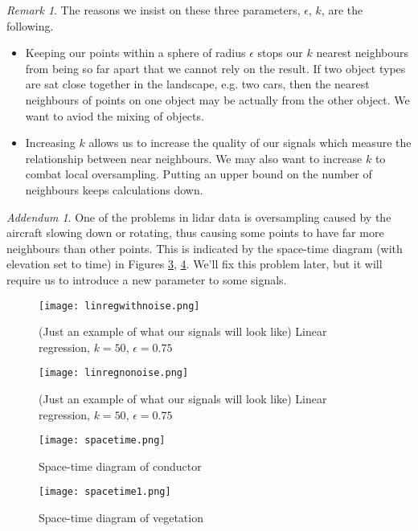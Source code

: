 \documentclass[a4paper,11pt,twoside]{article}
\theoremstyle{definition}
\theoremstyle{remark}
\newtheorem{rmk}[thm]{Remark}
\newtheorem{addendum}[thm]{Addendum}
\begin{document}
\begin{rmk}The reasons we insist on these three parameters, $\epsilon$, $k$, are the following.
\begin{itemize}
\item Keeping our points within a sphere of radius $\epsilon$ stops our $k$ nearest neighbours from being so far apart that we cannot rely on the result. If two object types are sat close together in the landscape, e.g. two cars, then the nearest neighbours of points on one object may be actually from the other object. We want to aviod the mixing of objects.
\item Increasing $k$ allows us to increase the quality of our signals which measure the relationship between near neighbours. We may also want to increase $k$ to combat local oversampling. Putting an upper bound on the number of neighbours keeps calculations down.
\end{itemize}
\end{rmk}
\begin{addendum}\label{add}One of the problems in lidar data is oversampling caused by the aircraft slowing down or rotating, thus causing some points to have far more neighbours than other points. This is indicated by the space-time diagram (with elevation set to time) in Figures \hyperref[spacetime]{\ref*{spacetime}}, \hyperref[spacetime]{\ref*{spacetime1}}. We'll fix this problem later, but it will require us to introduce a new parameter to some signals.
\end{addendum}
\newpage
\begin{figure}[!h]
  \caption{(Just an example of what our signals will look like) Linear regression, $k=50$, $\epsilon = 0.75$}
  \centering
    \texttt{[image: linregwithnoise.png]}
    \label{lrwn}
\end{figure}

\begin{figure}[!h]
  \caption{(Just an example of what our signals will look like) Linear regression, $k=50$, $\epsilon = 0.75$}
  \centering
    \texttt{[image: linregnonoise.png]}
    \label{lrnn}
\end{figure}
\newpage
\newpage
\begin{figure}[!h]
  \caption{Space-time diagram of conductor}
  \centering
    \texttt{[image: spacetime.png]}
    \label{spacetime}
\end{figure}
\begin{figure}[!h]
  \caption{Space-time diagram of vegetation}
  \centering
    \texttt{[image: spacetime1.png]}
    \label{spacetime1}
\end{figure}
\newpage
\end{document}
